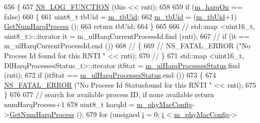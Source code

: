 \begin{DoxyCode}
656 \{
657         \hyperlink{log-macros-disabled_8h_a90b90d5bad1f39cb1b64923ea94c0761}{NS\_LOG\_FUNCTION} (\textcolor{keyword}{this} << rnti);
658 
659         \textcolor{keywordflow}{if} (\hyperlink{classns3_1_1MmWaveFlexTtiMaxRateMacScheduler_a43dee0cca8dce652c2a2dc750262708e}{m\_harqOn} == \textcolor{keyword}{false})
660         \{
661                 uint8\_t tbUid = \hyperlink{classns3_1_1MmWaveFlexTtiMaxRateMacScheduler_a24a4bdb5698dbeaccb6afc572b39f691}{m\_tbUid};
662                 \hyperlink{classns3_1_1MmWaveFlexTtiMaxRateMacScheduler_a24a4bdb5698dbeaccb6afc572b39f691}{m\_tbUid} = (\hyperlink{classns3_1_1MmWaveFlexTtiMaxRateMacScheduler_a24a4bdb5698dbeaccb6afc572b39f691}{m\_tbUid}+1) %
      \hyperlink{classns3_1_1MmWavePhyMacCommon_a40773d84172ebeb5aff125f56ebcc5ac}{GetNumHarqProcess} ();
663                 \textcolor{keywordflow}{return} tbUid;
664         \}
665 
666 \textcolor{comment}{//      std::map <uint16\_t, uint8\_t>::iterator it = m\_ulHarqCurrentProcessId.find (rnti);}
667 \textcolor{comment}{//      if (it == m\_ulHarqCurrentProcessId.end ())}
668 \textcolor{comment}{//      \{}
669 \textcolor{comment}{//              NS\_FATAL\_ERROR ("No Process Id found for this RNTI " << rnti);}
670 \textcolor{comment}{//      \}}
671         std::map <uint16\_t, DlHarqProcessesStatus\_t>::iterator itStat = 
      \hyperlink{classns3_1_1MmWaveFlexTtiMaxRateMacScheduler_a4c1a909f08f91a4c845df5310c35f9ff}{m\_ulHarqProcessesStatus}.find (rnti);
672         \textcolor{keywordflow}{if} (itStat == \hyperlink{classns3_1_1MmWaveFlexTtiMaxRateMacScheduler_a4c1a909f08f91a4c845df5310c35f9ff}{m\_ulHarqProcessesStatus}.end ())
673         \{
674                 \hyperlink{group__fatal_ga5131d5e3f75d7d4cbfd706ac456fdc85}{NS\_FATAL\_ERROR} (\textcolor{stringliteral}{"No Process Id Statusfound for this RNTI "} << rnti);
675         \}
676 
677         \textcolor{comment}{// search for available process ID, if none available return numHarqProcess+1}
678         uint8\_t harqId = \hyperlink{classns3_1_1MmWaveMacScheduler_a24d7af4971d2e500fe543cefbafa2fd9}{m\_phyMacConfig}->\hyperlink{classns3_1_1MmWavePhyMacCommon_a40773d84172ebeb5aff125f56ebcc5ac}{GetNumHarqProcess} ();
679         \textcolor{keywordflow}{for} (\textcolor{keywordtype}{unsigned} \hyperlink{bernuolliDistribution_8m_a6f6ccfcf58b31cb6412107d9d5281426}{i} = 0; \hyperlink{bernuolliDistribution_8m_a6f6ccfcf58b31cb6412107d9d5281426}{i} < \hyperlink{classns3_1_1MmWaveMacScheduler_a24d7af4971d2e500fe543cefbafa2fd9}{m\_phyMacConfig}->

\end{DoxyCode}
